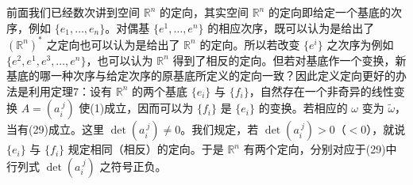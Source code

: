 前面我们已经数次讲到空间 $\mathbb R^n$ 的定向，其实空间 $\mathbb R^n$ 的定向即给定一个基底的次序，例如 $\{e_1,\ldots,e_n\}$。对偶基 $\{e^1,\ldots,e^n\}$ 的相应次序，既可以认为是给出了 $(\mathbb R^n)^*$ 之定向也可以认为是给出了 $\mathbb R^n$ 的定向。所以若改变 $\{e^i\}$ 之次序为例如 $\{e^2,e^1,e^3,\ldots,e^n\}$，也可以认为 $\mathbb R^n$ 得到了相反的定向。但若对基底作一个变换，新基底的哪一种次序与给定次序的原基底所定义的定向一致？因此定义定向更好的办法是利用定理7：设有 $\mathbb R^n$ 的两个基底 $\{e_i\}$ 与 $\{f_i\}$，自然存在一个非奇异的线性变换 $A=(a_i^{\ j})$ 使(1)成立，因而可以为 $\{f_i\}$ 是 $\{e_i\}$ 的变换。若相应的 $\omega$ 变为 $\widetilde\omega$，当有(29)成立。这里 $\det(a_i^{\ j})\ne0$。我们规定，若 $\det(a_i^{\ j})>0$（$<0$），就说 $\{e_i\}$ 与 $\{f_i\}$ 规定相同（相反）的定向。于是 $\mathbb R^n$ 有两个定向，分别对应于(29)中行列式 $\det(a_i^{\ j})$ 之符号正负。

